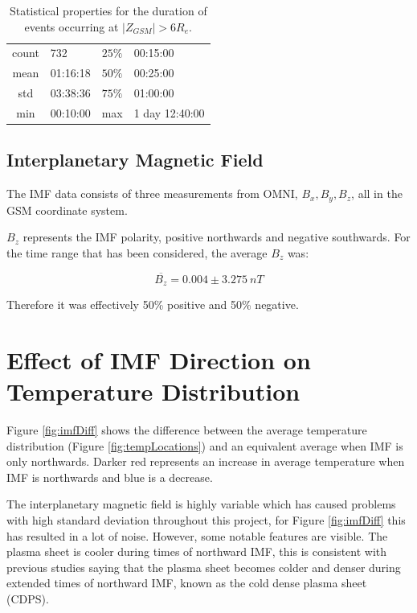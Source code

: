 \documentclass[12pt]{article}
\begin{document}
\begin{table}[]
    \begin{minipage}[c]{0.57\textwidth}
        \centering
        \begin{tabular}{||c|l||c|l||}
            \hline
            count & 732 & $25\%$ & 00:15:00 \\
            mean & 01:16:18 & $50\%$ & 00:25:00 \\
            std & 03:38:36 & $75\%$ & 01:00:00 \\
            min & 00:10:00 & max & 1 day 12:40:00 \\
            \hline
        \end{tabular}
    \end{minipage}\hfill
    \begin{minipage}[c]{0.4\textwidth}
        \caption{Statistical properties for the duration of events occurring at $|Z_{GSM}|>6R_e$.}
        \label{tab:event_durn}
    \end{minipage}
\end{table}

\subsection{Interplanetary Magnetic Field \label{interMF}}
The IMF data consists of three measurements from OMNI, $B_x, B_y, B_z$, all in the GSM coordinate system.

$B_z$ represents the IMF polarity, positive northwards and negative southwards. For the time range that has been considered, the average $B_z$ was:

\begin{equation}
    \overline{B_z} = 0.004 \pm 3.275\ nT
\end{equation}

Therefore it was effectively 50\% positive and 50\% negative. 

\section{Effect of IMF Direction on Temperature Distribution}
Figure \ref{fig:imfDiff} shows the difference between the average temperature distribution (Figure \ref{fig:tempLocations}) and an equivalent average when IMF is only northwards. Darker red represents an increase in average temperature when IMF is northwards and blue is a decrease.

The interplanetary magnetic field is highly variable which has caused problems with high standard deviation throughout this project, for Figure \ref{fig:imfDiff} this has resulted in a lot of noise. However, some notable features are visible. The plasma sheet is cooler during times of northward IMF, this is consistent with previous studies \cite{TAYLOR20081619} saying that the plasma sheet becomes colder and denser during extended times of northward IMF, known as the cold dense plasma sheet (CDPS).
\end{document}
